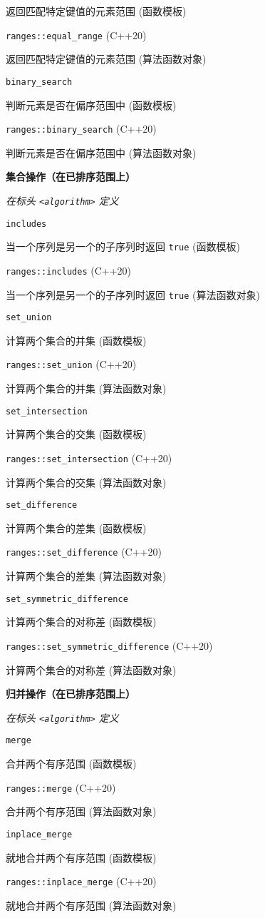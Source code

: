 返回匹配特定键值的元素范围 (函数模板)

\noindent \lstinline{ranges::equal_range} (C++20)

返回匹配特定键值的元素范围 (算法函数对象)

\noindent \lstinline{binary_search} 

判断元素是否在偏序范围中 (函数模板)

\noindent \lstinline{ranges::binary_search} (C++20)

判断元素是否在偏序范围中 (算法函数对象)


\noindent \textbf{集合操作（在已排序范围上）}

\textit{在标头 \lstinline{<algorithm>} 定义}


\noindent \lstinline{includes}

当⼀个序列是另⼀个的⼦序列时返回 \lstinline{true} (函数模板)

\noindent \lstinline{ranges::includes} (C++20) 

当⼀个序列是另⼀个的⼦序列时返回 \lstinline{true} (算法函数对象)

\noindent \lstinline{set_union} 

计算两个集合的并集 (函数模板)

\noindent \lstinline{ranges::set_union} (C++20) 

计算两个集合的并集 (算法函数对象)

\noindent \lstinline{set_intersection} 

计算两个集合的交集 (函数模板)

\noindent \lstinline{ranges::set_intersection} (C++20) 

计算两个集合的交集 (算法函数对象)

\noindent \lstinline{set_difference} 

计算两个集合的差集 (函数模板)

\noindent \lstinline{ranges::set_difference} (C++20) 

计算两个集合的差集 (算法函数对象)

\noindent \lstinline{set_symmetric_difference}

计算两个集合的对称差 (函数模板)

\noindent \lstinline{ranges::set_symmetric_difference} (C++20)

计算两个集合的对称差 (算法函数对象)

\noindent \textbf{归并操作（在已排序范围上）}

\textit{在标头 \lstinline{<algorithm>} 定义}

\noindent \lstinline{merge}

合并两个有序范围 (函数模板)

\noindent \lstinline{ranges::merge} (C++20)

合并两个有序范围 (算法函数对象)

\noindent \lstinline{inplace_merge}

就地合并两个有序范围 (函数模板)

\noindent \lstinline{ranges::inplace_merge} (C++20)

就地合并两个有序范围 (算法函数对象)